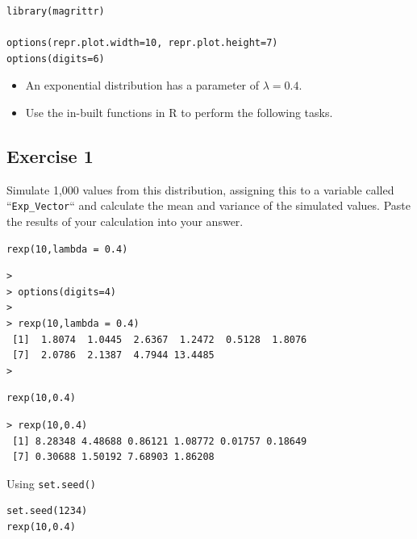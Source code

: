 \documentclass[a4paper,12pt]{article}
\begin{document}
\begin{framed} \begin{verbatim}
library(magrittr)

options(repr.plot.width=10, repr.plot.height=7)
options(digits=6)
\end{verbatim}\end{framed}


\newpage 

\begin{itemize}
    \item An exponential distribution has a parameter of $\lambda 
= 0.4$.

\item Use the in-built functions in R to perform the following tasks.
\end{itemize}




\subsection*{Exercise 1}
\noindent Simulate 1,000 values from this distribution, assigning this to a variable called ``\texttt{Exp\_Vector}`` and calculate the mean and variance of
the simulated values. Paste the results of your calculation into your answer.


\begin{framed} \begin{verbatim}
rexp(10,lambda = 0.4)
\end{verbatim}\end{framed}


\begin{verbatim}
> 
> options(digits=4)
> 
> rexp(10,lambda = 0.4)
 [1]  1.8074  1.0445  2.6367  1.2472  0.5128  1.8076
 [7]  2.0786  2.1387  4.7944 13.4485
> 
\end{verbatim}








\begin{framed} \begin{verbatim}
rexp(10,0.4)
\end{verbatim}\end{framed}

\begin{verbatim}
> rexp(10,0.4)
 [1] 8.28348 4.48688 0.86121 1.08772 0.01757 0.18649
 [7] 0.30688 1.50192 7.68903 1.86208
\end{verbatim}
\newpage
\noindent Using \texttt{set.seed()}\\
\begin{framed} \begin{verbatim}
set.seed(1234)
rexp(10,0.4)
\end{verbatim}\end{framed}
\end{document}
